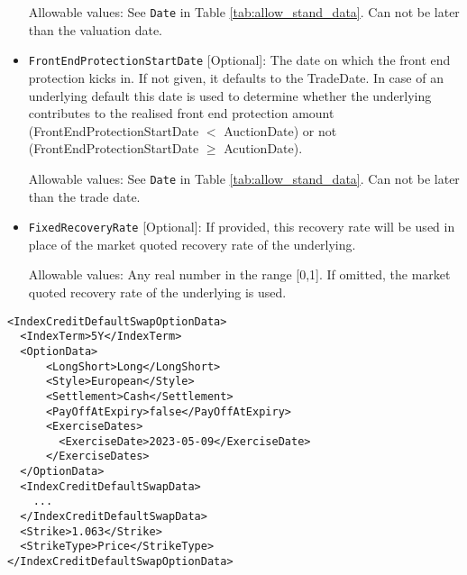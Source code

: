 \begin{itemize}
Allowable values: See \lstinline!Date! in Table \ref{tab:allow_stand_data}. Can not be later than the valuation date.
 
\item 
\lstinline!FrontEndProtectionStartDate! [Optional]: The date on which the front end protection kicks in. If not given,
it defaults to the TradeDate. In case of an underlying default this date is used to determine whether the underlying
contributes to the realised front end protection amount (FrontEndProtectionStartDate $<$ AuctionDate) or not
(FrontEndProtectionStartDate $\geq$ AcutionDate).
 
Allowable values: See \lstinline!Date! in Table \ref{tab:allow_stand_data}. Can not be later than the trade date.
 
\item \lstinline!FixedRecoveryRate! [Optional]: If provided, this recovery rate will be used in place of the market quoted recovery rate of the underlying.

Allowable values: Any real number in the range [0,1]. If omitted, the market quoted recovery rate of the underlying is used.
  
\end{itemize}

\begin{listing}[H]
\begin{verbatim}
<IndexCreditDefaultSwapOptionData>
  <IndexTerm>5Y</IndexTerm>
  <OptionData>
      <LongShort>Long</LongShort>
      <Style>European</Style>
      <Settlement>Cash</Settlement>
      <PayOffAtExpiry>false</PayOffAtExpiry>
      <ExerciseDates>
        <ExerciseDate>2023-05-09</ExerciseDate>
      </ExerciseDates>
  </OptionData>
  <IndexCreditDefaultSwapData>
    ... 
  </IndexCreditDefaultSwapData>
  <Strike>1.063</Strike>
  <StrikeType>Price</StrikeType>
</IndexCreditDefaultSwapOptionData>
\end{verbatim}
\caption{Example Structure of \lstinline!IndexCreditDefaultSwapOptionData! node.}
\label{lst:indexcdsoptiondata}
\end{listing}

